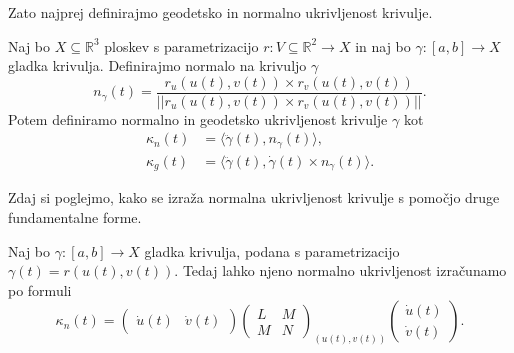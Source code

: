 Zato najprej definirajmo geodetsko in normalno ukrivljenost krivulje.

\begin{definicija}
\label{def_geodetska_in_normalna_ukrivljenost}
Naj bo $X \subseteq \mathbb{R}^3$ ploskev s parametrizacijo $r: V \subseteq \mathbb{R}^2 \to  X$ in naj bo $\gamma: [a,b] \to X$ gladka krivulja. 
Definirajmo normalo na krivuljo $\gamma$
\begin{equation*} n_{\gamma}(t) = \frac{r_u(u(t), v(t)) \times  r_v(u(t), v(t))}{\lvert\lvert r_u(u(t), v(t)) \times  r_v(u(t), v(t)) \rvert\rvert }.\end{equation*}
Potem definiramo normalno in geodetsko ukrivljenost krivulje $\gamma$ kot 
\begin{align*}
    \kappa_n(t) &= \langle \ddot{\gamma}(t), n_{\gamma}(t) \rangle,  \\
    \kappa_g(t) &= \langle \ddot{\gamma}(t), \dot{\gamma}(t) \times n_{\gamma}(t) \rangle.
\end{align*}

\end{definicija}

Zdaj si poglejmo, kako se izraža normalna ukrivljenost krivulje s pomočjo druge fundamentalne forme.

\begin{izrek}
\label{izr_izrazava_normalne_ukrivljenosti_z_drugo_fundamentalno_formo}
  Naj bo $\gamma: [a,b] \to X$ gladka krivulja, podana s parametrizacijo $\gamma(t) = r(u(t), v(t))$. Tedaj lahko njeno normalno ukrivljenost
  izračunamo po formuli 
  \begin{equation*} \kappa_n(t) = \begin{pmatrix}
    \dot{u}(t) & \dot{v}(t) 
  \end{pmatrix}  
  \begin{pmatrix}
    L & M \\
    M & N
  \end{pmatrix}_{(u(t), v(t))}  
  \begin{pmatrix}
    \dot{u}(t) \\
    \dot{v}(t) 
  \end{pmatrix}.  \end{equation*}
\end{izrek}


